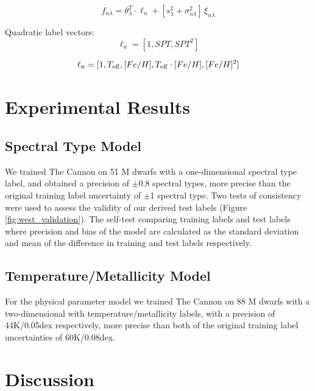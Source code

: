 \documentclass[modern]{aastex62}
\begin{document}
\begin{equation}
	f_{n\lambda} = \theta_{\lambda}^{T} \cdot \ell_{n} + [s_{\lambda}^{2} + \sigma_{n\lambda}^{2}] \,\xi_{n\lambda}
\end{equation}

Quadratic label vectors:
\begin{equation}
	\ell_{n} = [1, SPT, SPT^{2}]
\end{equation}

\begin{equation}
	\ell_{n} = [1, T_{\rm eff}, [Fe/H], T_{\rm eff} \cdot [Fe/H], [Fe/H]^{2}]
\end{equation}


\section{Experimental Results} \label{sec:results}

\subsection{Spectral Type Model}

We trained The Cannon on 51 M dwarfs with a one-dimensional spectral type label, and obtained a precision of $\pm$0.8 spectral types, more precise than the original training label uncertainty of $\pm$1 spectral type. Two tests of consistency were used to assess the validity of our derived test labels (Figure \ref{fig:west_validation}). The self-test comparing training labels and test labels where precision and bias of the model are calculated as the standard deviation and mean of the difference in training and test labels respectively.

\subsection{Temperature/Metallicity Model}

For the physical parameter model we trained The Cannon on 88 M dwarfs with a two-dimensional with temperature/metallicity labels, with a precision of 44K/0.05dex respectively, more precise than both of the original training label uncertainties of 60K/0.08dex.


\section{Discussion} \label{sec:discussion}
\end{document}
